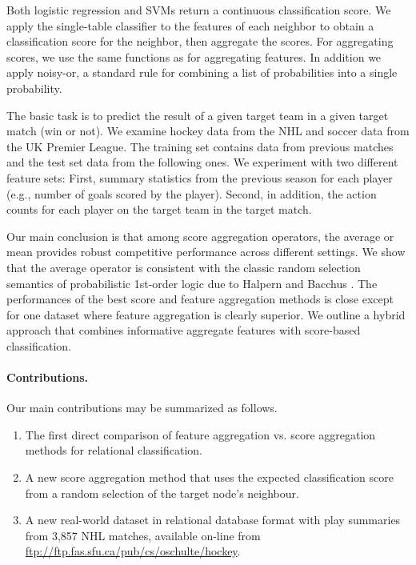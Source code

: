 \documentclass[oribibl]{llncs}%
\begin{document}
Both logistic regression and SVMs return a continuous classification score. We apply the single-table classifier to the features of each neighbor to obtain a classification score for the neighbor, then aggregate the scores. For aggregating scores, we use the same functions as for aggregating features.  In addition we apply noisy-or, a standard rule for combining a list of probabilities into a single probability.

The basic task is to predict the result of a given target team in a given target match (win or not). We examine hockey data from the NHL and soccer data from the UK Premier League. The training set contains data from previous matches and the test set data from the following ones. We experiment with two different feature sets: First, summary statistics from the previous season for each player (e.g., number of goals scored by the player). Second, in addition, the action counts for each player on the target team in the target match. 

Our main conclusion is that among score aggregation operators, the average or mean provides robust competitive performance across different settings. We show that the average operator is consistent  with the classic random selection semantics of probabilistic 1st-order logic due to Halpern and Bacchus \cite{Halpern90,Bacchus90}. The performances of the best score and feature aggregation methods is close except for one dataset where feature aggregation is clearly superior. We outline a hybrid approach that combines informative aggregate features with score-based classification.


\paragraph{Contributions.}

Our main contributions may be summarized as follows.

\begin{enumerate}
\item The first direct comparison of feature aggregation vs. score aggregation methods for relational classification.
\item A new score aggregation method that uses the expected classification score from a random selection of the target node's neighbour. 
\item A new real-world dataset in relational database format with play summaries from 3,857 NHL matches, available on-line from \url{ftp://ftp.fas.sfu.ca/pub/cs/oschulte/hockey}.
\end{enumerate}
\end{document}
